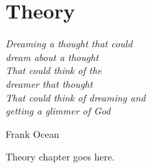 \chapter{Theory}
\label{chap:theory}

\epigraph{\textit{Dreaming a thought that could ~\\
                  dream about a thought ~\\
                  That could think of the ~\\
                  dreamer that thought ~\\
                  That could think of dreaming and ~\\
                  getting a glimmer of God}
                 }{Frank Ocean}

\noindent
Theory chapter goes here.
